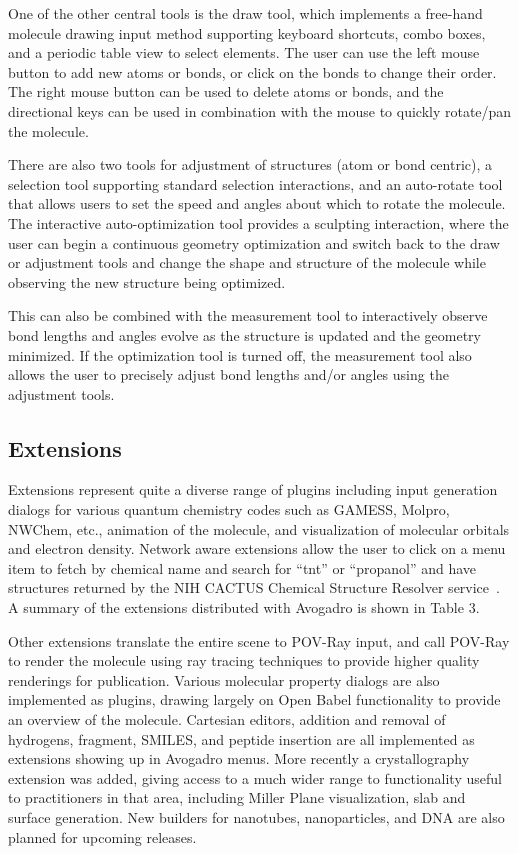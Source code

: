 \documentclass[10pt]{bmc_article}
\newenvironment{bmcformat}{\begin{raggedright}
  \baselineskip20pt\sloppy\setboolean{publ}{false}}{\end{raggedright}
  \baselineskip20pt\sloppy}
\begin{document}
\begin{bmcformat}
One of the other central tools is the draw tool, which implements a free-hand
molecule drawing input method supporting keyboard shortcuts, combo boxes, and a
periodic table view to select elements. The user can use the left mouse button
to add new atoms or bonds, or click on the bonds to change their order. The
right mouse button can be used to delete atoms or bonds, and the directional keys
can be used in combination with the mouse to quickly rotate/pan the molecule.

There are also two tools for adjustment of structures (atom or bond centric), a
selection tool supporting standard selection interactions, and an auto-rotate
tool that allows users to set the speed and angles about which to rotate the
molecule. The interactive auto-optimization tool provides a sculpting
interaction, where the user can begin a continuous geometry optimization and
switch back to the draw or adjustment tools and change the shape and structure
of the molecule while observing the new structure being optimized.

This can also be combined with the measurement tool to interactively observe
bond lengths and angles evolve as the structure is updated and the geometry
minimized. If the optimization tool is turned off, the measurement tool also
allows the user to precisely adjust bond lengths and/or angles using the
adjustment tools.

\subsection*{Extensions}

Extensions represent quite a diverse range of plugins including
input generation dialogs for various quantum chemistry codes such as GAMESS,
Molpro, NWChem, etc., animation of the molecule, and visualization of
molecular orbitals and electron density. Network aware extensions allow the user
to click on a menu item to fetch by chemical name and search for ``tnt'' or
``propanol'' and have structures returned by the NIH CACTUS Chemical Structure
Resolver service~\cite{StructureResolver}. A summary of the extensions
distributed with Avogadro is shown in Table 3.

Other extensions translate the entire scene to POV-Ray input, and call POV-Ray
to render the molecule using ray tracing techniques to provide higher quality
renderings for publication. Various molecular property dialogs are also
implemented as plugins, drawing largely on Open Babel functionality to provide
an overview of the molecule. Cartesian editors, addition and removal of
hydrogens, fragment, SMILES, and peptide insertion are all implemented as
extensions showing up in Avogadro menus. More recently a crystallography
extension was added, giving access to a much wider range to functionality
useful to practitioners in that area, including Miller Plane
visualization, slab and surface generation. New builders for
nanotubes, nanoparticles, and DNA are also planned for upcoming releases.


\end{bmcformat}
\end{document}
